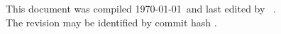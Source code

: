 \newcommand{\commitlink}{https://github.com/CaterHatterPillar/dv2524/commit/}
\expandafter\def\expandafter\commitlink\expandafter{\commitlink \gitAbbrevHash}

\yyyymmdddate
\renewcommand{\dateseparator}{-} %

\begin{frame}[t]

{\tiny This document was compiled \today\ and last edited by \gitAuthorName\ \gitAuthorDate .\\
The revision may be identified by commit hash \href{\commitlink}{\texttt{\gitAbbrevHash}}}.

\end{frame}
